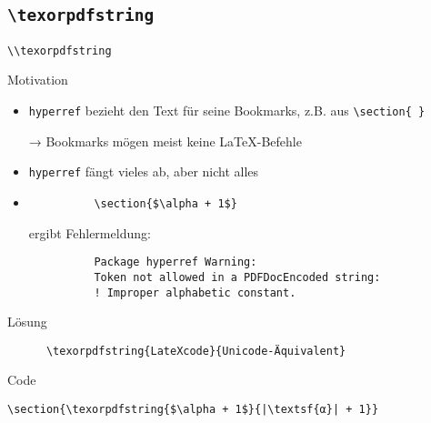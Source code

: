 \subsection{\texttt{\textbackslash texorpdfstring}}

\begin{frame}[fragile]{\lstinline+\\texorpdfstring+}
  \begin{block}{Motivation}
    \begin{itemize}
      \item \texttt{hyperref} bezieht den Text für seine Bookmarks, z.B. aus \lstinline+\section{ }+
      \item[→] Bookmarks mögen meist keine \LaTeX-Befehle
      \item \texttt{hyperref} fängt vieles ab, aber nicht alles
      \item
        \begin{lstlisting}
          \section{$\alpha + 1$}
        \end{lstlisting}
        ergibt Fehlermeldung:
        \begin{lstlisting}
          Package hyperref Warning:
          Token not allowed in a PDFDocEncoded string:
          ! Improper alphabetic constant.
        \end{lstlisting}
    \end{itemize}
  \end{block}
  \begin{block}{Lösung}
    \begin{lstlisting}
      \texorpdfstring{LateXcode}{Unicode-Äquivalent}
    \end{lstlisting}
  \end{block}
  \begin{block}{Code}
    \begin{lstlisting}[escapechar=|]
      \section{\texorpdfstring{$\alpha + 1$}{|\textsf{α}| + 1}}
    \end{lstlisting}
  \end{block}
\end{frame}
